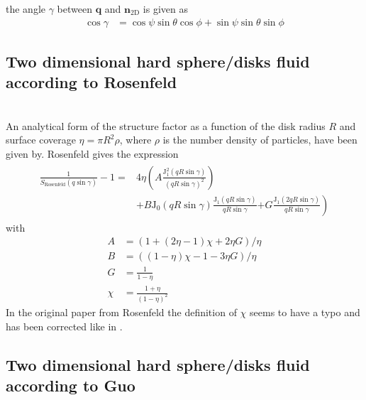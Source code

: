 the angle $\gamma$ between $\mathbf{q}$ and $ \mathbf{n}_\mathrm{2D}$ is given as
\begin{align}
  \cos\gamma &= \cos\psi\sin\theta\cos\phi+\sin\psi\sin\theta\sin\phi
\end{align}
\subsection{Two dimensional hard sphere/disks fluid according to Rosenfeld}
~\\

An analytical form of the structure factor as a function of the disk radius $R$ and surface coverage $\eta=\pi R^2 \rho$, where $\rho$ is the number density of particles, have been given by\cite{Rosenfeld1990,Guo2006}.
Rosenfeld \cite{Rosenfeld1990} gives the expression
\begin{align}
\begin{split}
\frac{1}{S_\mathrm{Rosenfeld}(q\sin\gamma)}-1 = &
4\eta
                    \left(A \frac{\mathrm{J}_1^2(qR\sin\gamma)}{(qR\sin\gamma)^2} \right) \\
                   & +B\mathrm{J}_0(qR\sin\gamma)\frac{\mathrm{J}_1(qR\sin\gamma)}{qR\sin\gamma} \left. +G\frac{\mathrm{J}_1(2qR\sin\gamma)}{qR\sin\gamma}  \right)
\end{split}
\end{align}
with
\begin{align}
A &=\left(1+(2\eta-1)\chi+2\eta G\right)/\eta \\
B &=\left((1-\eta)\chi-1-3\eta G\right)/\eta \\
G &= \frac{1}{1-\eta} \\
\chi &= \frac{1+\eta}{(1-\eta)^2}
\end{align}
In the original paper from Rosenfeld the definition of $\chi$ seems to have a typo and has been corrected like in \cite{Engel2009}.

\subsection {Two dimensional hard sphere/disks fluid according to Guo}
~\\

